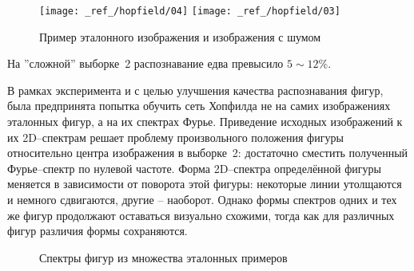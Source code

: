 \documentclass[12pt,a4paper]{article}
\begin{document}
\begin{figure}[H]
	\centering
	\texttt{[image: \_ref\_/hopfield/04]}	\quad	
	\texttt{[image: \_ref\_/hopfield/03]}		
	\caption{Пример эталонного изображения и изображения с шумом}
	\label{fig:06}
\end{figure}

\noindent
На ''сложной'' выборке \textnumero\,2 распознавание едва превысило 
$5\sim12\%$.

В рамках эксперимента и с целью улучшения качества распознавания 
фигур, была предпринята попытка обучить сеть Хопфилда не на 
самих изображениях эталонных фигур, а на их спектрах Фурье. 
Приведение исходных изображений к их 2D--спектрам решает 
проблему произвольного положения фигуры относительно центра 
изображения в выборке \textnumero\,2: достаточно сместить 
полученный Фурье--спектр по нулевой частоте. 
Форма 2D--спектра определённой фигуры меняется в зависимости от поворота 
этой фигуры: некоторые линии утолщаются и немного сдвигаются, 
другие -- наоборот. 
Однако формы спектров одних и тех же фигур продолжают оставаться визуально схожими, тогда как для различных фигур различия формы сохраняются.

\begin{figure}[H]
	\centering
	\begin{minipage}[h]{0.29\linewidth}
	\end{minipage}
	\hfill
	\begin{minipage}[h]{0.29\linewidth}
	\end{minipage}
	\hfill
	\begin{minipage}[h]{0.29\linewidth}
	\end{minipage}
		\vfill
	\begin{minipage}[h]{0.49\linewidth}
	\end{minipage}
		\hfill
	\begin{minipage}[h]{0.49\linewidth}
	\end{minipage}
	\caption{Спектры фигур из множества эталонных примеров}
	\label{fig:07}
\end{figure}
\end{document}
